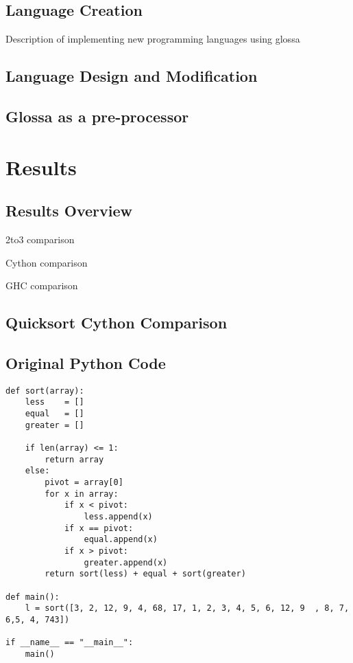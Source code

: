 \documentclass{article}
\begin{document}
\subsection{Language Creation}
Description of implementing new programming languages using glossa

\subsection{Language Design and Modification}
\subsection{Glossa as a pre-processor}

\section{Results}

\subsection{Results Overview}

2to3 comparison

Cython comparison

GHC comparison

\subsection{Quicksort Cython Comparison}

\newpage
\subsection{Original Python Code}

\lstset{language=Python}
\begin{lstlisting}
def sort(array):
    less    = []
    equal   = []
    greater = []

    if len(array) <= 1:
        return array
    else:
        pivot = array[0]
        for x in array:
            if x < pivot:
                less.append(x)
            if x == pivot:
                equal.append(x)
            if x > pivot:
                greater.append(x)
        return sort(less) + equal + sort(greater)

def main():
    l = sort([3, 2, 12, 9, 4, 68, 17, 1, 2, 3, 4, 5, 6, 12, 9  , 8, 7, 6,5, 4, 743])

if __name__ == "__main__":
    main()
\end{lstlisting}
\end{document}
